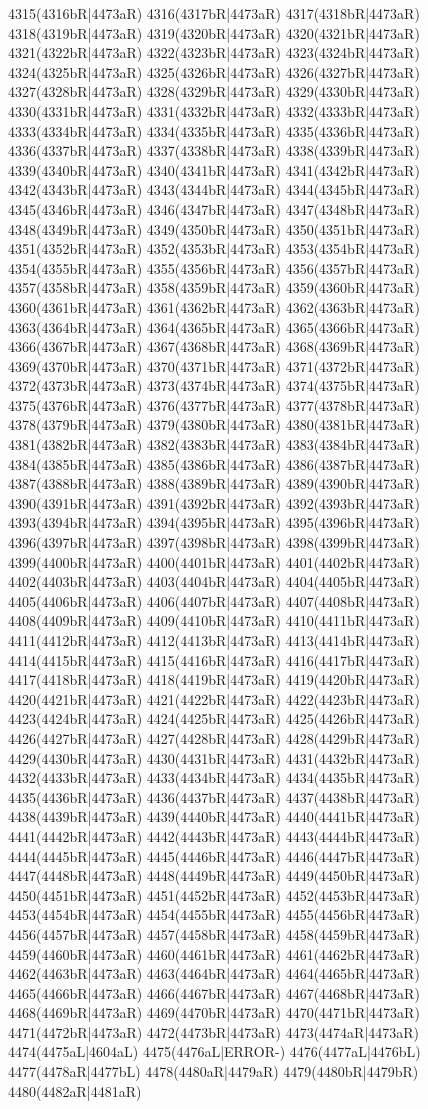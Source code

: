 4315(4316bR|4473aR) 4316(4317bR|4473aR) 4317(4318bR|4473aR) 4318(4319bR|4473aR) 4319(4320bR|4473aR) 4320(4321bR|4473aR) 4321(4322bR|4473aR) 4322(4323bR|4473aR) 4323(4324bR|4473aR) 4324(4325bR|4473aR) 4325(4326bR|4473aR) 4326(4327bR|4473aR) 4327(4328bR|4473aR) 4328(4329bR|4473aR) 4329(4330bR|4473aR) 4330(4331bR|4473aR) 4331(4332bR|4473aR) 4332(4333bR|4473aR) 4333(4334bR|4473aR) 4334(4335bR|4473aR) 4335(4336bR|4473aR) 4336(4337bR|4473aR) 4337(4338bR|4473aR) 4338(4339bR|4473aR) 4339(4340bR|4473aR) 4340(4341bR|4473aR) 4341(4342bR|4473aR) 4342(4343bR|4473aR) 4343(4344bR|4473aR) 4344(4345bR|4473aR) 4345(4346bR|4473aR) 4346(4347bR|4473aR) 4347(4348bR|4473aR) 4348(4349bR|4473aR) 4349(4350bR|4473aR) 4350(4351bR|4473aR) 4351(4352bR|4473aR) 4352(4353bR|4473aR) 4353(4354bR|4473aR) 4354(4355bR|4473aR) 4355(4356bR|4473aR) 4356(4357bR|4473aR) 4357(4358bR|4473aR) 4358(4359bR|4473aR) 4359(4360bR|4473aR) 4360(4361bR|4473aR) 4361(4362bR|4473aR) 4362(4363bR|4473aR) 4363(4364bR|4473aR) 4364(4365bR|4473aR) 4365(4366bR|4473aR) 4366(4367bR|4473aR) 4367(4368bR|4473aR) 4368(4369bR|4473aR) 4369(4370bR|4473aR) 4370(4371bR|4473aR) 4371(4372bR|4473aR) 4372(4373bR|4473aR) 4373(4374bR|4473aR) 4374(4375bR|4473aR) 4375(4376bR|4473aR) 4376(4377bR|4473aR) 4377(4378bR|4473aR) 4378(4379bR|4473aR) 4379(4380bR|4473aR) 4380(4381bR|4473aR) 4381(4382bR|4473aR) 4382(4383bR|4473aR) 4383(4384bR|4473aR) 4384(4385bR|4473aR) 4385(4386bR|4473aR) 4386(4387bR|4473aR) 4387(4388bR|4473aR) 4388(4389bR|4473aR) 4389(4390bR|4473aR) 4390(4391bR|4473aR) 4391(4392bR|4473aR) 4392(4393bR|4473aR) 4393(4394bR|4473aR) 4394(4395bR|4473aR) 4395(4396bR|4473aR) 4396(4397bR|4473aR) 4397(4398bR|4473aR) 4398(4399bR|4473aR) 4399(4400bR|4473aR) 4400(4401bR|4473aR) 4401(4402bR|4473aR) 4402(4403bR|4473aR) 4403(4404bR|4473aR) 4404(4405bR|4473aR) 4405(4406bR|4473aR) 4406(4407bR|4473aR) 4407(4408bR|4473aR) 4408(4409bR|4473aR) 4409(4410bR|4473aR) 4410(4411bR|4473aR) 4411(4412bR|4473aR) 4412(4413bR|4473aR) 4413(4414bR|4473aR) 4414(4415bR|4473aR) 4415(4416bR|4473aR) 4416(4417bR|4473aR) 4417(4418bR|4473aR) 4418(4419bR|4473aR) 4419(4420bR|4473aR) 4420(4421bR|4473aR) 4421(4422bR|4473aR) 4422(4423bR|4473aR) 4423(4424bR|4473aR) 4424(4425bR|4473aR) 4425(4426bR|4473aR) 4426(4427bR|4473aR) 4427(4428bR|4473aR) 4428(4429bR|4473aR) 4429(4430bR|4473aR) 4430(4431bR|4473aR) 4431(4432bR|4473aR) 4432(4433bR|4473aR) 4433(4434bR|4473aR) 4434(4435bR|4473aR) 4435(4436bR|4473aR) 4436(4437bR|4473aR) 4437(4438bR|4473aR) 4438(4439bR|4473aR) 4439(4440bR|4473aR) 4440(4441bR|4473aR) 4441(4442bR|4473aR) 4442(4443bR|4473aR) 4443(4444bR|4473aR) 4444(4445bR|4473aR) 4445(4446bR|4473aR) 4446(4447bR|4473aR) 4447(4448bR|4473aR) 4448(4449bR|4473aR) 4449(4450bR|4473aR) 4450(4451bR|4473aR) 4451(4452bR|4473aR) 4452(4453bR|4473aR) 4453(4454bR|4473aR) 4454(4455bR|4473aR) 4455(4456bR|4473aR) 4456(4457bR|4473aR) 4457(4458bR|4473aR) 4458(4459bR|4473aR) 4459(4460bR|4473aR) 4460(4461bR|4473aR) 4461(4462bR|4473aR) 4462(4463bR|4473aR) 4463(4464bR|4473aR) 4464(4465bR|4473aR) 4465(4466bR|4473aR) 4466(4467bR|4473aR) 4467(4468bR|4473aR) 4468(4469bR|4473aR) 4469(4470bR|4473aR) 4470(4471bR|4473aR) 4471(4472bR|4473aR) 4472(4473bR|4473aR) 4473(4474aR|4473aR) 4474(4475aL|4604aL) 4475(4476aL|ERROR-) 4476(4477aL|4476bL) 4477(4478aR|4477bL) 4478(4480aR|4479aR) 4479(4480bR|4479bR) 4480(4482aR|4481aR) 